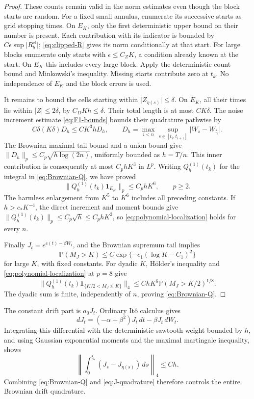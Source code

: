 \documentclass[11pt]{article}
\theoremstyle{remark}
\newcommand{\norm}[1]{\lVert#1\rVert}
\newcommand{\abs}[1]{\lvert#1\rvert}
\newcommand{\ind}{\mathbf 1}
\begin{document}
\begin{proof}
These counts remain valid in the norm estimates even though the block
starts are random. For a fixed small annulus, enumerate its successive
starts as grid stopping times. On \(E_K\), only the first deterministic
upper bound on their number is present. Each contribution with its
indicator is bounded by \(C\epsilon\sup\abs{R_b^{\mathrm{cl}}}\);
\eqref{eq:clipped-R} gives its norm conditionally at that start.
For large blocks enumerate only starts with \(\epsilon\le C_ZK\),
a condition already known at the start. On \(E_K\) this includes
every large block. Apply the deterministic count bound and
Minkowski's inequality. Missing starts contribute zero at \(t_k\).
No independence of \(E_K\) and the block errors is used.

It remains to bound the cells starting within \(\abs{Z_{\eta(s)}}\le\delta\).
On \(E_K\), all their times lie within \(\abs Z\le2\delta\), by
\(C_DKh\le\delta\). Their total length is at most \(CK\delta\).
The noise increment estimate \eqref{eq:F1-bounds} bounds their
quadrature pathwise by
\[
 C\delta(K\delta)D_h\le CK^3hD_h,\qquad
 D_h=\max_{i<n}\sup_{s\in[t_i,t_{i+1}]}\abs{W_s-W_{t_i}} .
\]
The Brownian maximal tail bound and a union bound give
\(\norm{D_h}_p\le C_p\sqrt{h\log(2n)}\), uniformly bounded as
\(h=T/n\). This inner contribution is consequently at most
\(C_phK^3\) in \(L^p\).
Writing \(Q_h^{(1)}(t_k)\) for the integral in
\eqref{eq:Brownian-Q}, we have proved
\begin{equation}\label{eq:polynomial-localization}
 \norm{Q_h^{(1)}(t_k)\ind_{E_K}}_p\le C_phK^6,\qquad p\ge2 .
\end{equation}
The harmless enlargement from \(K^5\) to \(K^6\) includes all preceding
constants. If \(h>c_*K^{-4}\), the direct increment and moment bounds
give \(\norm{Q_h^{(1)}(t_k)}_p\le C_p\sqrt h\le C_phK^2\),
so \eqref{eq:polynomial-localization} holds for every \(n\).

Finally \(J_t=e^{c(t)-\beta W_t}\), and the Brownian supremum tail implies
\[
 \mathbb P(M_J>K)\le C\exp\{-c_1(\log K-C_1)^2\}
\]
for large \(K\), with fixed constants.
For dyadic \(K\), H\"older's inequality and
\eqref{eq:polynomial-localization} at \(p=8\) give
\[
 \norm{Q_h^{(1)}(t_k)
        \ind_{\{K/2<M_J\le K\}}}_4
 \le ChK^6\mathbb P(M_J>K/2)^{1/8}.
\]
The dyadic sum is finite, independently of \(n\), proving
\eqref{eq:Brownian-Q}.
\end{proof}

The constant drift part is \(a_0J_t\).
Ordinary It\^o calculus gives
\begin{equation}\label{eq:dJ}
 dJ_t=(-\alpha+\beta^2)J_t\,dt-\beta J_t\,dW_t.
\end{equation}
Integrating this differential with the deterministic sawtooth weight
bounded by \(h\), and using Gaussian exponential moments and the
maximal martingale inequality, shows
\begin{equation}\label{eq:J-quadrature}
 \left\|\int_0^{t_k}(J_s-J_{\eta(s)})\,ds\right\|_4\le Ch .
\end{equation}
Combining \eqref{eq:Brownian-Q} and \eqref{eq:J-quadrature} therefore
controls the entire Brownian drift quadrature.
\end{document}
